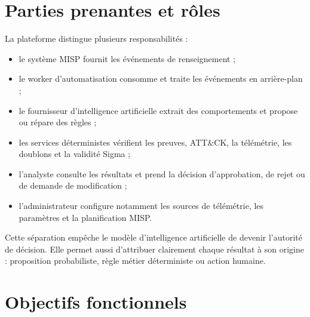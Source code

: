 \section{Parties prenantes et rôles}

La plateforme distingue plusieurs responsabilités :
\begin{itemize}[leftmargin=1.2cm]
    \item le système MISP fournit les événements de renseignement ;
    \item le worker d'automatisation consomme et traite les événements en arrière-plan ;
    \item le fournisseur d'intelligence artificielle extrait des comportements et propose ou répare des règles ;
    \item les services déterministes vérifient les preuves, ATT\&CK, la télémétrie, les doublons et la validité Sigma ;
    \item l'analyste consulte les résultats et prend la décision d'approbation, de rejet ou de demande de modification ;
    \item l'administrateur configure notamment les sources de télémétrie, les paramètres et la planification MISP.
\end{itemize}

Cette séparation empêche le modèle d'intelligence artificielle de devenir l'autorité de décision. Elle permet aussi d'attribuer clairement chaque résultat à son origine : proposition probabiliste, règle métier déterministe ou action humaine.

\section{Objectifs fonctionnels}

